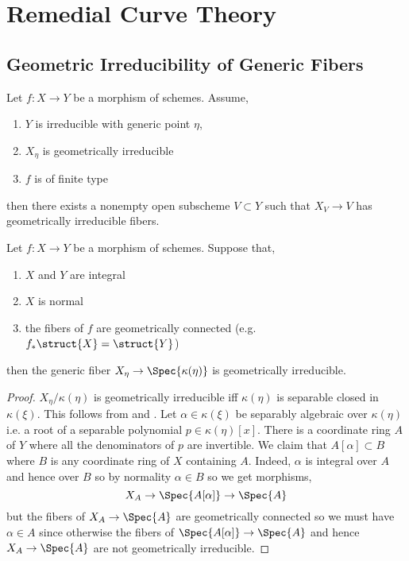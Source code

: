 \documentclass[12pt]{article}
\begin{document}
\sloppy

\section{Remedial Curve Theory}

\subsection{Geometric Irreducibility of Generic Fibers}

\begin{lemma}
Let $f : X \to Y$ be a morphism of schemes. Assume,
\begin{enumerate}
\item $Y$ is irreducible with generic point $\eta$,
\item $X_\eta$ is geometrically irreducible
\item $f$ is of finite type
\end{enumerate}
then there exists a nonempty open subscheme $V \subset Y$ such that $X_V \to V$ has geometrically irreducible fibers.
\end{lemma}

\begin{lemma} \label{lemma:normal_geom_integral}
Let $f : X \to Y$ be a morphism of schemes. Suppose that,
\begin{enumerate}
\item $X$ and $Y$ are integral
\item $X$ is normal
\item the fibers of $f$ are geometrically connected (e.g. $f_* \struct{X} = \struct{Y}$)
\end{enumerate}
then the generic fiber $X_\eta \to \Spec{\kappa(\eta)}$ is geometrically irreducible.
\end{lemma}

\begin{proof}
$X_\eta / \kappa(\eta)$ is geometrically irreducible iff $\kappa(\eta)$ is separable closed in $\kappa(\xi)$. This follows from  and . Let $\alpha \in \kappa(\xi)$ be separably algebraic over $\kappa(\eta)$ i.e. a root of a separable polynomial $p \in \kappa(\eta)[x]$. There is a coordinate ring $A$ of $Y$ where all the denominators of $p$ are invertible. We claim that $A[\alpha] \subset B$ where $B$ is any coordinate ring of $X$ containing $A$. Indeed, $\alpha$ is integral over $A$ and hence over $B$ so by normality $\alpha \in B$ so we get morphisms,
\[ X_A \to \Spec{A[\alpha]} \to \Spec{A} \]
but the fibers of $X_A \to \Spec{A}$ are geometrically connected so we must have $\alpha \in A$ since otherwise the fibers of $\Spec{A[\alpha]} \to \Spec{A}$ and hence $X_A \to \Spec{A}$ are not geometrically irreducible.
\end{proof}
\end{document}
